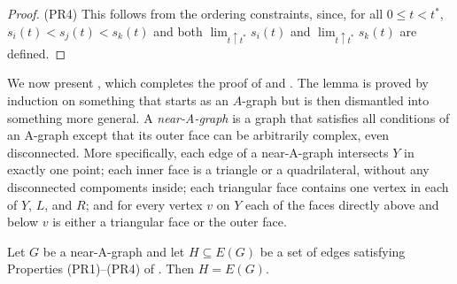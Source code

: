 \begin{proof}
		
(PR4) This follows from the ordering
constraints, since, for all $0\le t< t^*$,
		$s_i(t)<s_j(t)<s_k(t)$ and both $\lim_{t\uparrow
		t^*}s_i(t)$ and $\lim_{t\uparrow t^*}s_k(t)$ are defined.
	\end{proof}
	
We now present , which completes the proof of  and . The lemma is proved by induction on something
that starts as an $A$-graph but is then dismantled into something
more general.  A \emph{near-A-graph} is a graph that satisfies all
conditions of an A-graph except that its outer face can be arbitrarily
complex, even disconnected.  More specifically, each edge of a near-A-graph intersects $Y$
in exactly one point; each inner face is a triangle or a quadrilateral,
without any disconnected compoments inside;
each triangular face contains one vertex in each of $Y$, $L$, and $R$;
and for every vertex $v$ on $Y$ each of the faces directly above and
below $v$ is either a triangular face or the outer face.

\begin{lem}
Let $G$ be a near-A-graph and let $H \subseteq E(G)$ be a set of edges satisfying Properties (PR1)--(PR4) of . 
	Then $H=E(G)$.
\end{lem}

